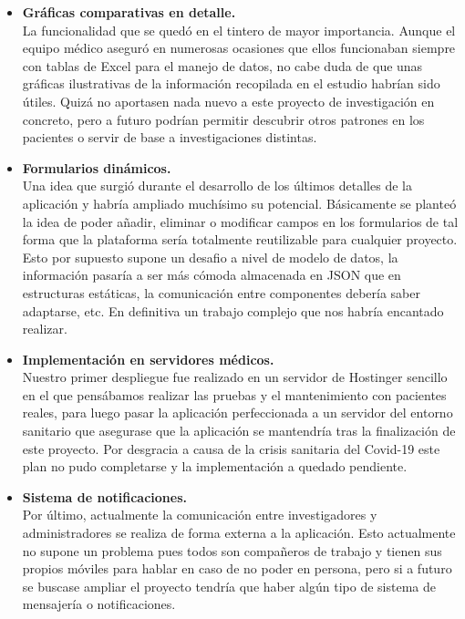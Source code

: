 \begin{itemize}
  \item\textbf{Gráficas comparativas en detalle.} \\
  La funcionalidad que se quedó en el tintero de mayor importancia. Aunque el equipo médico aseguró en numerosas ocasiones que ellos funcionaban siempre con tablas de Excel para el manejo de datos, no cabe duda de que unas gráficas ilustrativas de la información recopilada en el estudio habrían sido útiles. Quizá no aportasen nada nuevo a este proyecto de investigación en concreto, pero a futuro podrían permitir descubrir otros patrones en los pacientes o servir de base a investigaciones distintas. \\
  
  \item\textbf{Formularios dinámicos.} \\
  Una idea que surgió durante el desarrollo de los últimos detalles de la aplicación y habría ampliado muchísimo su potencial. Básicamente se planteó la idea de poder añadir, eliminar o modificar campos en los formularios de tal forma que la plataforma sería totalmente reutilizable para cualquier proyecto. Esto por supuesto supone un desafio a nivel de modelo de datos, la información pasaría a ser más cómoda almacenada en JSON que en estructuras estáticas, la comunicación entre componentes debería saber adaptarse, etc. En definitiva un trabajo complejo que nos habría encantado realizar. \\
  
  \item\textbf{Implementación en servidores médicos.} \\
  Nuestro primer despliegue fue realizado en un servidor de Hostinger sencillo en el que pensábamos realizar las pruebas y el mantenimiento con pacientes reales, para luego pasar la aplicación perfeccionada a un servidor del entorno sanitario que asegurase que la aplicación se mantendría tras la finalización de este proyecto. Por desgracia a causa de la crisis sanitaria del Covid-19 este plan no pudo completarse y la implementación a quedado pendiente.
  
  \item\textbf{Sistema de notificaciones.} \\
  Por último, actualmente la comunicación entre investigadores y administradores se realiza de forma externa a la aplicación. Esto actualmente no supone un problema pues todos son compañeros de trabajo y tienen sus propios móviles para hablar en caso de no poder en persona, pero si a futuro se buscase ampliar el proyecto tendría que haber algún tipo de sistema de mensajería o notificaciones. 
  \newline
  

\end{itemize}
